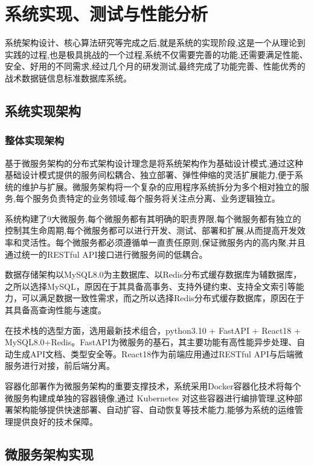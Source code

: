 \chapter{系统实现、测试与性能分析}

系统架构设计、核心算法研究等完成之后,就是系统的实现阶段,这是一个从理论到实践的过程,也是极具挑战的一个过程,系统不仅需要完善的功能,还需要满足性能、安全、好用的不同需求,经过几个月的研发测试,最终完成了功能完善、性能优秀的战术数据链信息标准数据库系统。

\section{系统实现架构}

\subsection{整体实现架构}

基于微服务架构的分布式架构设计理念是将系统架构作为基础设计模式,通过这种基础设计模式提供的服务间松耦合、独立部署、弹性伸缩的灵活扩展能力,便于系统的维护与扩展。微服务架构将一个复杂的应用程序系统拆分为多个相对独立的服务,每个服务负责特定的业务领域,每个服务将关注点分离、业务逻辑独立。

系统构建了9大微服务,每个微服务都有其明确的职责界限,每个微服务都有独立的控制其生命周期,每个微服务都可以进行开发、测试、部署和扩展,从而提高开发效率和灵活性。每个微服务都必须遵循单一直责任原则,保证微服务内的高内聚,并且通过统一的RESTful API接口进行微服务间的低耦合。

数据存储架构以MySQL8.0为主数据库、以Redis分布式缓存数据库为辅数据库，之所以选择MySQL，原因在于其具备高事务、支持外键约束、支持全文索引等能力，可以满足数据一致性需求，而之所以选择Redis分布式缓存数据库，原因在于其具备高查询性能与速度。

在技术栈的选型方面，选用最新技术组合，python3.10 + FastAPI + React18 + MySQL8.0+Redis。FastAPI为微服务的基石，其主要功能有高性能异步处理、自动生成API文档、类型安全等。React18作为前端应用通过RESTful API与后端微服务进行对接，前后端分离。

容器化部署作为微服务架构的重要支撑技术，系统采用Docker容器化技术将每个微服务构建成单独的容器镜像,通过 Kubernetes 对这些容器进行编排管理,这种部署架构能够提供快速部署、自动扩容、自动恢复等技术能力,能够为系统的运维管理提供良好的技术保障。

\section{微服务架构实现}

